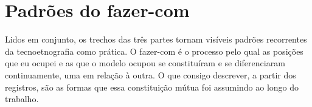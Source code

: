 
\section*{Padrões do fazer-com}

Lidos em conjunto, os trechos das três partes tornam visíveis padrões recorrentes da tecnoetnografia como prática. O fazer-com é o processo pelo qual as posições que eu ocupei e as que o modelo ocupou se constituíram e se diferenciaram continuamente, uma em relação à outra. O que consigo descrever, a partir dos registros, são as formas que essa constituição mútua foi assumindo ao longo do trabalho.


